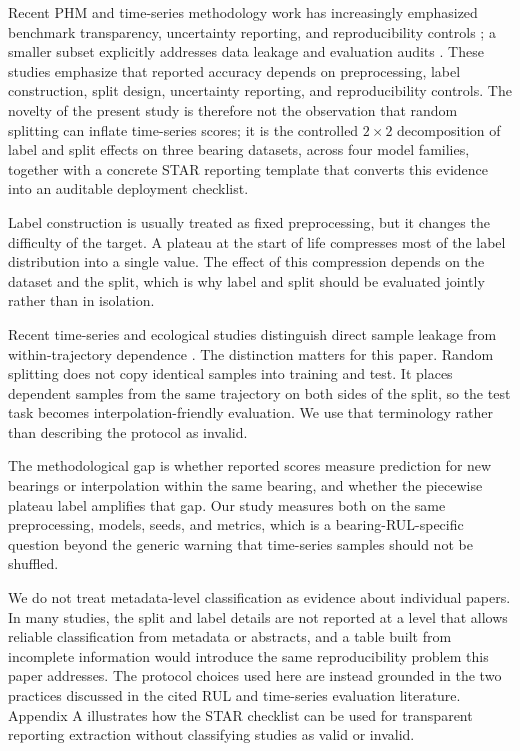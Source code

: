 \documentclass[pdflatex,sn-mathphys-num]{sn-jnl}
\begin{document}
Recent PHM and time-series methodology work has increasingly emphasized benchmark transparency, uncertainty reporting, and reproducibility controls \cite{phmconf2025rethinking,review2020bearing,mst2024cqr,icsrs2023splitconformal,phme2026conformal,ress2022bayesian,eaai2025explainable}; a smaller subset explicitly addresses data leakage and evaluation audits \cite{leakage_nature,leakage_frontiers}. These studies emphasize that reported accuracy depends on preprocessing, label construction, split design, uncertainty reporting, and reproducibility controls. The novelty of the present study is therefore not the observation that random splitting can inflate time-series scores; it is the controlled $2\times 2$ decomposition of label and split effects on three bearing datasets, across four model families, together with a concrete STAR reporting template that converts this evidence into an auditable deployment checklist.

Label construction is usually treated as fixed preprocessing, but it changes the difficulty of the target. A plateau at the start of life compresses most of the label distribution into a single value. The effect of this compression depends on the dataset and the split, which is why label and split should be evaluated jointly rather than in isolation.

Recent time-series and ecological studies distinguish direct sample leakage from within-trajectory dependence \cite{leakage_nature,leakage_frontiers}. The distinction matters for this paper. Random splitting does not copy identical samples into training and test. It places dependent samples from the same trajectory on both sides of the split, so the test task becomes interpolation-friendly evaluation. We use that terminology rather than describing the protocol as invalid.

The methodological gap is whether reported scores measure prediction for new bearings or interpolation within the same bearing, and whether the piecewise plateau label amplifies that gap. Our study measures both on the same preprocessing, models, seeds, and metrics, which is a bearing-RUL-specific question beyond the generic warning that time-series samples should not be shuffled.

We do not treat metadata-level classification as evidence about individual papers. In many studies, the split and label details are not reported at a level that allows reliable classification from metadata or abstracts, and a table built from incomplete information would introduce the same reproducibility problem this paper addresses. The protocol choices used here are instead grounded in the two practices discussed in the cited RUL and time-series evaluation literature. Appendix A illustrates how the STAR checklist can be used for transparent reporting extraction without classifying studies as valid or invalid.
\end{document}
